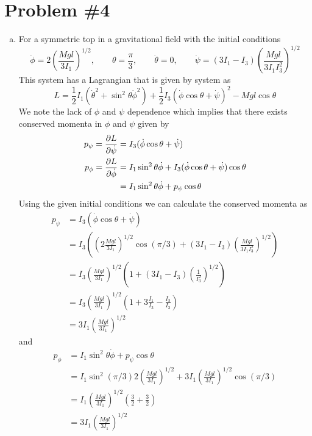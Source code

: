 \documentclass[11pt]{article}
\numberwithin{equation}{section}
\begin{document}
\section{Problem \#4}
\begin{enumerate}[(a)]
\item For a symmetric top in a gravitational field with the initial conditions
$$\dot{\phi} = 2\left(\frac{Mgl}{3I_1}\right)^{1/2},\qquad \theta=\frac{\pi}{3},\qquad \dot{\theta}=0,\qquad \dot{\psi}=(3I_1-I_3)\left(\frac{Mgl}{3I_1I_3^2}\right)^{1/2}$$
This system has a Lagrangian that is given by
system as
$$L = \frac{1}{2}I_1(\dot{\theta}^2+\sin^2\theta\dot{\phi}^2) + \frac{1}{2}I_3(\dot{\phi}\cos\theta+\dot{\psi})^2 - Mgl\cos\theta$$
We note the lack of $\phi$ and $\psi$ dependence which implies that there exists conserved 
momenta in $\phi$ and $\psi$ given by
\begin{align*}
p_{\psi} = \frac{\partial{L}}{\partial{\dot{\psi}}} &= I_3(\dot{\phi}\cos\theta+\dot{\psi})\\
p_{\phi} = \frac{\partial{L}}{\partial{\dot{\phi}}} &= I_1\sin^2\theta\dot{\phi} + I_3(\dot{\phi}\cos\theta+\dot{\psi})\cos\theta \\
&= I_1\sin^2\theta\dot{\phi} + p_{\psi}\cos\theta \\
\end{align*}
Using the given initial conditions we can calculate the conserved momenta as
\begin{align*}
p_{\psi} &= I_3(\dot{\phi}\cos\theta+\dot{\psi})\\
&= I_3\left(\left(2\frac{Mgl}{3I_1}\right)^{1/2}\cos(\pi/3)+(3I_1-I_3)\left(\frac{Mgl}{3I_1I_3^2}\right)^{1/2}\right)\\
&= I_3\left(\frac{Mgl}{3I_1}\right)^{1/2}\left(1+(3I_1-I_3)\left(\frac{1}{I_3^2}\right)^{1/2}\right)\\
&= I_3\left(\frac{Mgl}{3I_1}\right)^{1/2}\left(1+3\frac{I_1}{I_3}-\frac{I_3}{I_3}\right)\\
&= 3I_1\left(\frac{Mgl}{3I_1}\right)^{1/2}
\end{align*}
and
\begin{align*}
p_{\phi} &= I_1\sin^2\theta\dot{\phi} + p_{\psi}\cos\theta \\
&= I_1\sin^2(\pi/3)2\left(\frac{Mgl}{3I_1}\right)^{1/2} + 3I_1\left(\frac{Mgl}{3I_1}\right)^{1/2}\cos(\pi/3) \\
&= I_1\left(\frac{Mgl}{3I_1}\right)^{1/2}\left(\frac{3}{2} + \frac{3}{2}\right) \\
&= 3I_1\left(\frac{Mgl}{3I_1}\right)^{1/2}
\end{align*}

\end{enumerate}
\end{document}
